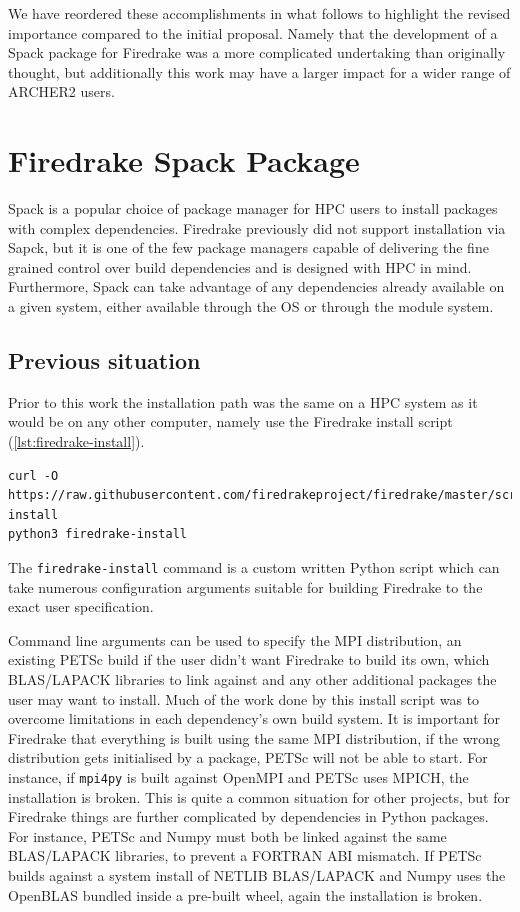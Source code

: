 \documentclass[a4paper,11pt]{article}
\begin{document}
We have reordered these accomplishments in what follows to highlight the revised importance compared to the initial proposal.
Namely that the development of a Spack package for Firedrake was a more complicated undertaking than originally thought, but additionally this work may have a larger impact for a wider range of ARCHER2 users.


\section{Firedrake Spack Package}
\label{sec:spack}
Spack\cite{spackweb,spackpaper} is a popular choice of package manager for HPC users to install packages with complex dependencies.
Firedrake previously did not support installation via Sapck, but it is one of the few package managers capable of delivering the fine grained control over build dependencies and is designed with HPC in mind.
Furthermore, Spack can take advantage of any dependencies already available on a given system, either available through the OS or through the module system.

\subsection{Previous situation}
\label{ssec:prev}
Prior to this work the installation path was the same on a HPC system as it would be on any other computer, namely use the Firedrake install script (\cref{lst:firedrake-install}).
\begin{lstlisting}[float,caption={Firedrake install script install commands},label={lst:firedrake-install}]
curl -O https://raw.githubusercontent.com/firedrakeproject/firedrake/master/scripts/firedrake-install
python3 firedrake-install
\end{lstlisting}
The \verb`firedrake-install` command is a custom written Python script which can take numerous configuration arguments suitable for building Firedrake to the exact user specification.

Command line arguments can be used to specify the MPI distribution, an existing PETSc build if the user didn't want Firedrake to build its own, which BLAS/LAPACK libraries to link against and any other additional packages the user may want to install.
Much of the work done by this install script was to overcome limitations in each dependency's own build system.
It is important for Firedrake that everything is built using the same MPI distribution, if the wrong distribution gets initialised by a package, PETSc will not be able to start.
For instance, if \verb`mpi4py` is built against OpenMPI and PETSc uses MPICH, the installation is broken.
This is quite a common situation for other projects, but for Firedrake things are further complicated by dependencies in Python packages.
For instance, PETSc and Numpy must both be linked against the same BLAS/LAPACK libraries, to prevent a FORTRAN ABI mismatch.
If PETSc builds against a system install of NETLIB BLAS/LAPACK and Numpy uses the OpenBLAS bundled inside a pre-built wheel, again the installation is broken.
\end{document}
